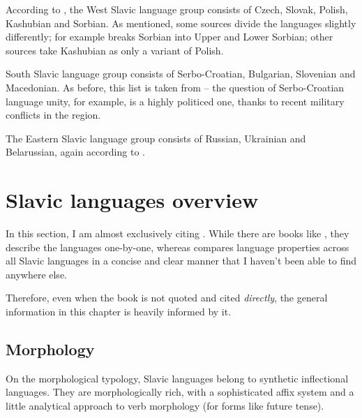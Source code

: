 According to \cite{sussex2011slavic}, the West Slavic language group consists of Czech, Slovak, Polish, Kashubian and Sorbian. As mentioned, some sources divide the languages slightly differently; for example \cite{siewierska1998overview} breaks Sorbian into Upper and Lower Sorbian; other sources take Kashubian as only a variant of Polish.

South Slavic language group consists of Serbo-Croatian, Bulgarian, Slovenian and Macedonian. As before, this list is taken from \cite{sussex2011slavic} -- the question of Serbo-Croatian language unity, for example, is a highly politiced one, thanks to recent military conflicts in the region.

The Eastern Slavic language group consists of Russian, Ukrainian and Belarussian, again according to \cite{sussex2011slavic}.




\section{Slavic languages overview}
\label{slavic_overview}
In this section, I am almost exclusively citing \cite{sussex2011slavic}. While there are books like \cite{comrie2003slavonic}, they describe the languages one-by-one, whereas \cite{sussex2011slavic} compares language properties across all Slavic languages in a concise and clear manner that I haven't been able to find anywhere else.

Therefore, even when the book is not quoted and cited \emph{directly}, the general information in this chapter is heavily informed by it.

\subsection{Morphology}
\label{linguo:morphology}
On the morphological typology, Slavic languages belong to synthetic inflectional languages. They are morphologically rich, with a sophisticated affix system and a little analytical approach to verb morphology (for forms like future tense).

